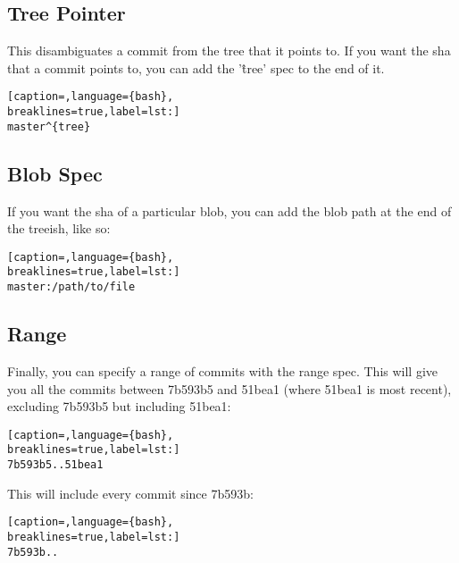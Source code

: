 \subsection{Tree Pointer}
This disambiguates a commit from the tree that it points to. If you want the
sha that a commit points to, you can add the '\^{tree}' spec to the end of it.
\lstset{basicstyle=\scriptsize, numbers=none, captionpos=b, tabsize=4}
\begin{lstlisting}[caption=,language={bash},
breaklines=true,label=lst:]
master^{tree}
\end{lstlisting}

\subsection{Blob Spec}
If you want the sha of a particular blob, you can add the blob path at the end
of the treeish, like so:
\lstset{basicstyle=\scriptsize, numbers=none, captionpos=b, tabsize=4}
\begin{lstlisting}[caption=,language={bash},
breaklines=true,label=lst:]
master:/path/to/file
\end{lstlisting}

\subsection{Range}
Finally, you can specify a range of commits with the range spec. This will give
you all the commits between 7b593b5 and 51bea1 (where 51bea1 is most recent),
excluding 7b593b5 but including 51bea1:
\lstset{basicstyle=\scriptsize, numbers=none, captionpos=b, tabsize=4}
\begin{lstlisting}[caption=,language={bash},
breaklines=true,label=lst:]
7b593b5..51bea1
\end{lstlisting}

This will include every commit since 7b593b:
\lstset{basicstyle=\scriptsize, numbers=none, captionpos=b, tabsize=4}
\begin{lstlisting}[caption=,language={bash},
breaklines=true,label=lst:]
7b593b.. 
\end{lstlisting}
